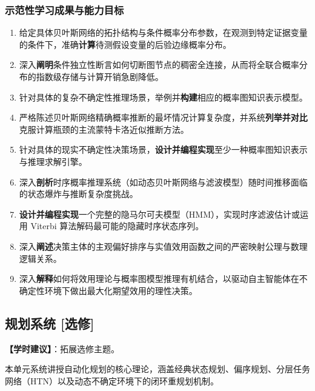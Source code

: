\subsubsection{示范性学习成果与能力目标}
\begin{enumerate}
    \item 给定具体贝叶斯网络的拓扑结构与条件概率分布参数，在观测到特定证据变量的条件下，准确\textbf{计算}待测假设变量的后验边缘概率分布。
    \item 深入\textbf{阐明}条件独立性断言如何切断图节点的稠密全连接，从而将全联合概率分布的指数级存储与计算开销急剧降低。
    \item 针对具体的复杂不确定性推理场景，举例并\textbf{构建}相应的概率图知识表示模型。
    \item 严格陈述贝叶斯网络精确概率推断的最坏情况计算复杂度，并系统\textbf{列举并对比}克服计算瓶颈的主流蒙特卡洛近似推断方法。
    \item 针对具体的现实不确定性决策场景，\textbf{设计并编程实现}至少一种概率图知识表示与推理求解引擎。
    \item 深入\textbf{剖析}时序概率推理系统（如动态贝叶斯网络与滤波模型）随时间推移面临的状态爆炸与推断复杂度挑战。
    \item \textbf{设计并编程实现}一个完整的隐马尔可夫模型（HMM），实现时序滤波估计或运用 Viterbi 算法解码最可能的隐藏时序状态序列。
    \item 深入\textbf{阐述}决策主体的主观偏好排序与实值效用函数之间的严密映射公理与数理逻辑关系。
    \item 深入\textbf{解释}如何将效用理论与概率图模型推理有机结合，以驱动自主智能体在不确定性环境下做出最大化期望效用的理性决策。
\end{enumerate}

\subsection{规划系统 [选修]}
\textbf{【学时建议】}：拓展选修主题。

本单元系统讲授自动化规划的核心理论，涵盖经典状态规划、偏序规划、分层任务网络（HTN）以及动态不确定环境下的闭环重规划机制。

